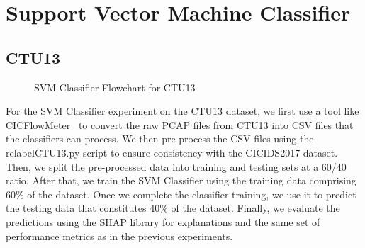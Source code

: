 \section{Support Vector Machine Classifier}\label{sec:SVMClassifier}

\subsection{CTU13}\label{subsec:SVMClassifierCTU13}
\begin{figure}[H]
\centering
{}
\caption{SVM Classifier Flowchart for CTU13}\label{fig:SVMFlowCTU13}
\end{figure}

For the SVM Classifier experiment on the CTU13 dataset, we first use a tool like CICFlowMeter~\cite{lashkari2017characterization} to convert the raw PCAP files from CTU13 into CSV files that the classifiers can process. We then pre-process the CSV files using the relabelCTU13.py script to ensure consistency with the CICIDS2017 dataset. Then, we split the pre-processed data into training and testing sets at a 60/40 ratio. After that, we train the SVM Classifier using the training data comprising 60\% of the dataset. Once we complete the classifier training, we use it to predict the testing data that constitutes 40\% of the dataset. Finally, we evaluate the predictions using the SHAP library for explanations and the same set of performance metrics as in the previous experiments.

